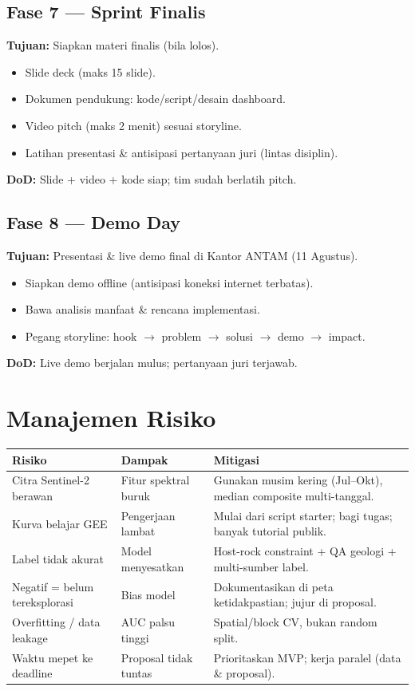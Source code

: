 \documentclass[11pt,a4paper]{article}
\newcommand{\todo}{\item[$\square$]}
\begin{document}
\subsection{Fase 7 --- Sprint Finalis}
\textbf{Tujuan:} Siapkan materi finalis (bila lolos).
\begin{itemize}[leftmargin=1.5em]
  \todo Slide deck (maks 15 slide).
  \todo Dokumen pendukung: kode/script/desain dashboard.
  \todo Video pitch (maks 2 menit) sesuai storyline.
  \todo Latihan presentasi \& antisipasi pertanyaan juri (lintas disiplin).
\end{itemize}
\textbf{DoD:} Slide + video + kode siap; tim sudah berlatih pitch.

\subsection{Fase 8 --- Demo Day}
\textbf{Tujuan:} Presentasi \& live demo final di Kantor ANTAM (11 Agustus).
\begin{itemize}[leftmargin=1.5em]
  \todo Siapkan demo offline (antisipasi koneksi internet terbatas).
  \todo Bawa analisis manfaat \& rencana implementasi.
  \todo Pegang storyline: hook $\rightarrow$ problem $\rightarrow$ solusi $\rightarrow$ demo $\rightarrow$ impact.
\end{itemize}
\textbf{DoD:} Live demo berjalan mulus; pertanyaan juri terjawab.

\section{Manajemen Risiko}
\label{sec:risk}

\renewcommand{\arraystretch}{1.3}
\begin{longtable}{p{4.3cm} p{4.0cm} p{6.2cm}}
\toprule
\rowcolor{softgray}
\textbf{Risiko} & \textbf{Dampak} & \textbf{Mitigasi} \\
\midrule
\endhead
Citra Sentinel-2 berawan & Fitur spektral buruk & Gunakan musim kering (Jul--Okt), median composite multi-tanggal. \\
Kurva belajar GEE & Pengerjaan lambat & Mulai dari script starter; bagi tugas; banyak tutorial publik. \\
Label tidak akurat & Model menyesatkan & Host-rock constraint + QA geologi + multi-sumber label. \\
Negatif = belum tereksplorasi & Bias model & Dokumentasikan di peta ketidakpastian; jujur di proposal. \\
Overfitting / data leakage & AUC palsu tinggi & Spatial/block CV, bukan random split. \\
Waktu mepet ke deadline & Proposal tidak tuntas & Prioritaskan MVP; kerja paralel (data \& proposal). \\
\bottomrule
\end{longtable}
\end{document}
